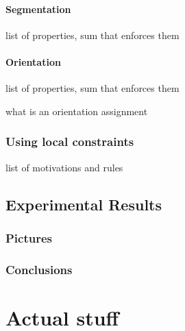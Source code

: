 \documentclass{tufte-book}
\begin{document}
    \subsubsection{Segmentation}
      list of properties, sum that enforces them
    \subsubsection{Orientation}
      list of properties, sum that enforces them

      what is an orientation assignment

  \subsection{Using local constraints}
    list of motivations and rules

\section{Experimental Results}
  \subsection{Pictures}
  \subsection{Conclusions}

\chapter{Actual stuff}
\end{document}
